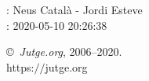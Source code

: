 \documentclass[11pt]{article}
\begin{document}
    \newcommand{\SampleTwoCol}{\SampleTwoColInputOutput{sample1}{}}
    \newcommand{\SampleOneCol}{\SampleOneColInputOutput{sample1}{}}

    \ProblemInformation
    \Author: Neus Català - Jordi Esteve\\    
    \Generation: 2020-05-10 20:26:38

    \bigskip

    \copyright\ \emph{Jutge.org}, 2006--2020. \\
    https:$/\!\!/$jutge.org
\end{document}
